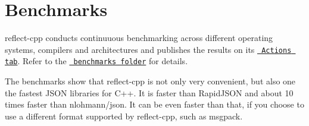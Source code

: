 \chapter{Benchmarks}
\hypertarget{md_external_2reflect-cpp_2docs_2benchmarks}{}\label{md_external_2reflect-cpp_2docs_2benchmarks}
\label{md_external_2reflect-cpp_2docs_2benchmarks_autotoc_md526}%
%


reflect-\/cpp conducts continuuous benchmarking across different operating systems, compilers and architectures and publishes the results on its \href{https://github.com/getml/reflect-cpp/actions}{\texttt{ Actions tab}}. Refer to the \href{https://github.com/getml/reflect-cpp/tree/main/benchmarks}{\texttt{ benchmarks folder}} for details.

The benchmarks show that reflect-\/cpp is not only very convenient, but also one the fastest JSON libraries for C++. It is faster than Rapid\+JSON and about 10 times faster than nlohmann/json. It can be even faster than that, if you choose to use a different format supported by reflect-\/cpp, such as msgpack. 